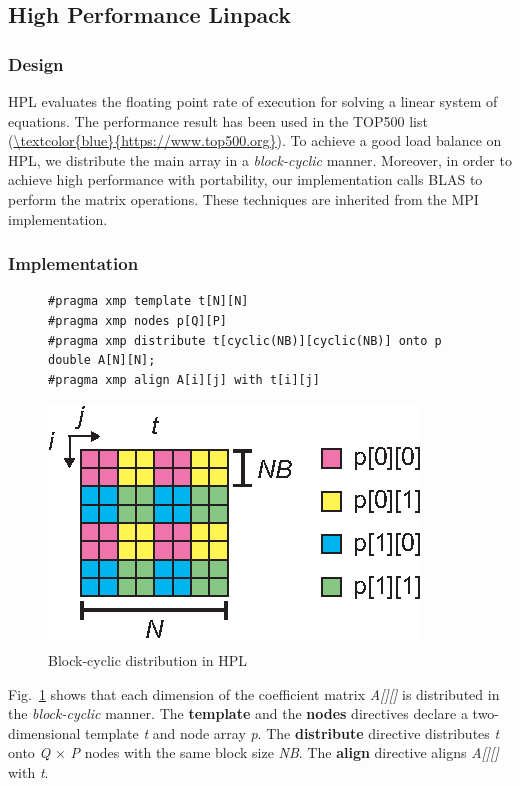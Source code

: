 \documentclass[graybox]{svmult}
\begin{document}
\subsection{High Performance Linpack}
\subsubsection{Design}
HPL evaluates the floating point rate of execution for solving a linear system of equations. 
The performance result has been used in the TOP500 list (\url{\textcolor{blue}{https://www.top500.org}}).
To achieve a good load balance on HPL,
we distribute the main array in a {\it block-cyclic} manner.
Moreover, in order to achieve high performance with portability,
our implementation calls BLAS\cite{blas} to perform the matrix operations.
These techniques are inherited from the MPI implementation.

\subsubsection{Implementation}
\begin{figure}[h]
\begin{lstlisting}
#pragma xmp template t[N][N]
#pragma xmp nodes p[Q][P]
#pragma xmp distribute t[cyclic(NB)][cyclic(NB)] onto p
double A[N][N];
#pragma xmp align A[i][j] with t[i][j]
\end{lstlisting}
%
\sidecaption
    \includegraphics[scale=1.1,clip]{img/hpl-bc.eps}
    \caption{Block-cyclic distribution in HPL\cite{hpca}}\label{fig:hpl-bc}
\end{figure}

Fig.~\ref{fig:hpl-bc} shows that each dimension of the coefficient matrix {\it A[][]} is distributed in the {\it block-cyclic} manner.
The {\bf template} and the {\bf nodes} directives declare a two-dimensional template {\it t} and node array {\it p}.
The {\bf distribute} directive distributes {\it t} onto {\it Q} $\times$ {\it P} nodes with the same block size {\it NB}.
The {\bf align} directive aligns {\it A[][]} with {\it t}.
\end{document}
